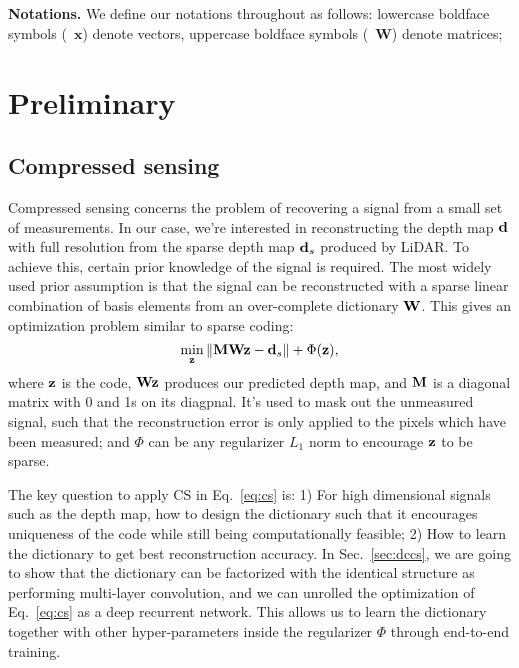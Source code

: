 \\
\\
\noindent\textbf{Notations.} We define our notations throughout as follows: lowercase boldface symbols (\eg~$\mathbf{x}$) denote vectors, uppercase boldface symbols (\eg~$\mathbf{W}$) denote matrices;
 
\section{Preliminary}
\subsection{Compressed sensing}
Compressed sensing concerns the problem of recovering a signal from a small set of measurements. In our case, we're interested in reconstructing the depth map $\mathbf{d}$ with full resolution from the sparse depth map $\mathbf{d}_s$ produced by LiDAR. To achieve this, certain prior knowledge of the signal is required. The most widely used prior assumption is that the signal can be reconstructed with a sparse linear combination of basis elements from an over-complete dictionary $\mathbf{W}$. This gives an optimization problem similar to sparse coding:
\begin{equation}
    \min_{\mathbf{z}} \Vert \mathbf{M}\mathbf{W}\mathbf{z} - \mathbf{d}_s \Vert + \Phi(\mathbf{z}),
    \label{eq:cs}
\end{equation}
where $\mathbf{z}$ is the code, $\mathbf{W}\mathbf{z}$ produces our predicted depth map, and $\mathbf{M}$ is a diagonal matrix with 0 and 1s on its diagpnal. It's used to mask out the unmeasured signal, such that the reconstruction error is only applied to the pixels which have been measured; and $\Phi$ can be any regularizer \eg $L_1$ norm to encourage $\mathbf{z}$ to be sparse.

The key question to apply CS in Eq.~\ref{eq:cs} is: 1) For high dimensional signals such as the depth map, how to design the dictionary such that it encourages uniqueness of the code while still being computationally feasible; 2) How to learn the dictionary to get best reconstruction accuracy. In Sec.~\ref{sec:dccs}, we are going to show that the dictionary can be factorized with the identical structure as performing multi-layer convolution, and we can unrolled the optimization of  Eq.~\ref{eq:cs} as a deep recurrent network. This allows us to learn the dictionary together with other hyper-parameters inside the regularizer $\Phi$ through end-to-end training.

